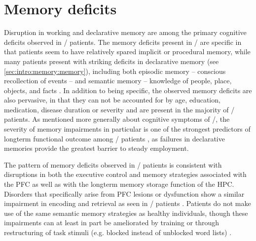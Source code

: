 \section{Memory deficits}\label{sec:intro:scz:memory}
Disruption in working and declarative memory are among the primary cognitive deficits observed in \scz/ patients.
The memory deficits present in \scz/ are specific in that patients seem to have relatively spared implicit or procedural memory, while many patients present with striking deficits in declarative memory (see \autoref{sec:intro:memory:memory}), including both episodic memory -- conscious recollection of events -- and semantic memory -- knowledge of people, place, objects, and facts \citep{O'Carroll2000, Aleman1999, Gold2010}.
In addition to being specific, the observed memory deficits are also pervasive, in that they can not be accounted for by age, education, medication, disease duration or severity \citep{Ranganath2008} and are present in the majority of \scz/ patients.
As mentioned more generally about cognitive symptoms of \scz/, the severity of memory impairments in particular is one of the strongest predictors of longterm functional outcome among \scz/ patients \citep{Green1996}, as failures in declarative memories provide the greatest barrier to steady employment.

The pattern of memory deficits observed in \scz/ patients is consistent with disruptions in both the executive control and memory strategies associated with the \ac{PFC} as well as with the longterm memory storage function of the \ac{HPC}.
Disorders that specifically arise from \ac{PFC} lesions or dysfunction show a similar impairment in encoding and retrieval as seen in \scz/ patients \citep{Ranganath2008}.
Patients do not make use of the same semantic memory strategies as healthy individuals, though these impairments can at least in part be ameliorated by training or through restructuring of task stimuli (e.g. blocked instead of unblocked word lists) \citep{Gold1992, Stone1998}.

